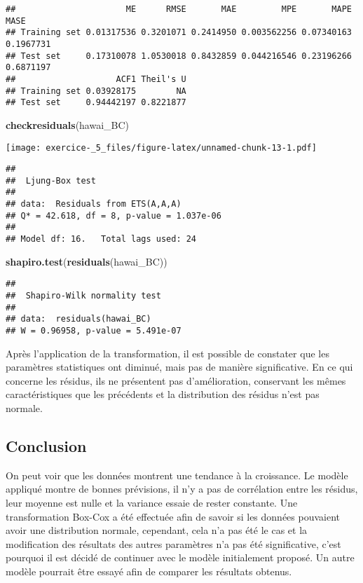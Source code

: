 \documentclass[
]{article}
\newenvironment{Shaded}{\begin{snugshade}}{\end{snugshade}}
\newcommand{\KeywordTok}[1]{\textcolor[rgb]{0.13,0.29,0.53}{\textbf{#1}}}
\newcommand{\NormalTok}[1]{#1}
\begin{document}
\begin{verbatim}
##                      ME      RMSE       MAE         MPE       MAPE      MASE
## Training set 0.01317536 0.3201071 0.2414950 0.003562256 0.07340163 0.1967731
## Test set     0.17310078 1.0530018 0.8432859 0.044216546 0.23196266 0.6871197
##                    ACF1 Theil's U
## Training set 0.03928175        NA
## Test set     0.94442197 0.8221877
\end{verbatim}

\begin{Shaded}
\begin{Highlighting}[]
\KeywordTok{checkresiduals}\NormalTok{(hawai_BC)}
\end{Highlighting}
\end{Shaded}

\texttt{[image: exercice-\_5\_files/figure-latex/unnamed-chunk-13-1.pdf]}

\begin{verbatim}
## 
##  Ljung-Box test
## 
## data:  Residuals from ETS(A,A,A)
## Q* = 42.618, df = 8, p-value = 1.037e-06
## 
## Model df: 16.   Total lags used: 24
\end{verbatim}

\begin{Shaded}
\begin{Highlighting}[]
\KeywordTok{shapiro.test}\NormalTok{(}\KeywordTok{residuals}\NormalTok{(hawai_BC))}
\end{Highlighting}
\end{Shaded}

\begin{verbatim}
## 
##  Shapiro-Wilk normality test
## 
## data:  residuals(hawai_BC)
## W = 0.96958, p-value = 5.491e-07
\end{verbatim}

Après l'application de la transformation, il est possible de constater
que les paramètres statistiques ont diminué, mais pas de manière
significative. En ce qui concerne les résidus, ils ne présentent pas
d'amélioration, conservant les mêmes caractéristiques que les précédents
et la distribution des résidus n'est pas normale.

\hypertarget{conclusion}{%
\subsection{Conclusion}\label{conclusion}}

On peut voir que les données montrent une tendance à la croissance. Le
modèle appliqué montre de bonnes prévisions, il n'y a pas de corrélation
entre les résidus, leur moyenne est nulle et la variance essaie de
rester constante. Une transformation Box-Cox a été effectuée afin de
savoir si les données pouvaient avoir une distribution normale,
cependant, cela n'a pas été le cas et la modification des résultats des
autres paramètres n'a pas été significative, c'est pourquoi il est
décidé de continuer avec le modèle initialement proposé. Un autre modèle
pourrait être essayé afin de comparer les résultats obtenus.
\end{document}
